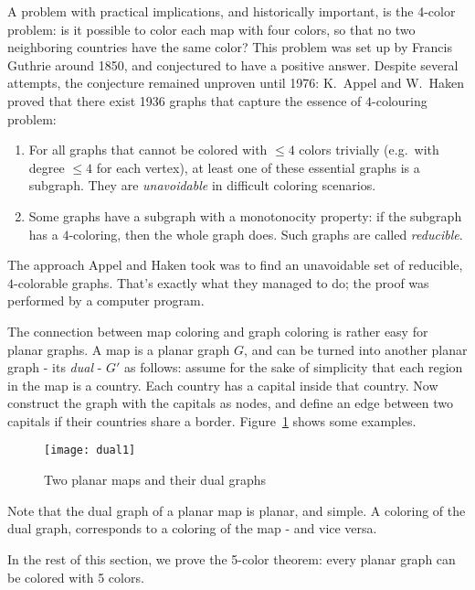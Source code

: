 A problem with practical implications, and historically important, is
the 4-color problem: is it possible to color each map with four
colors, so that no two neighboring countries have the same color? This
problem was set up by Francis Guthrie around 1850, and conjectured to
have a positive answer. Despite several attempts, the conjecture
remained unproven until 1976: K.\ Appel and W.\ Haken proved that there
exist 1936 graphs that capture the essence of $4$-colouring problem:
\begin{enumerate}
	\item For all graphs that cannot be colored with $\leq 4$ colors trivially (e.g.\ with degree $\leq 4$ for each vertex), at least one of these essential graphs is a subgraph. They are \emph{unavoidable} in difficult coloring scenarios.
	\item Some graphs have a subgraph with a monotonocity property: if the subgraph has a $4$-coloring, then the whole graph does. Such graphs are called \emph{reducible}.
\end{enumerate}
The approach Appel and Haken took was to find an unavoidable set of reducible, $4$-colorable graphs. That's exactly what they managed to do; the proof was performed by a computer program.

The connection between map coloring and graph coloring is rather easy
for planar graphs. A map is a planar graph $G$, and can be turned into
another planar graph - its {\em dual} - $G'$ as follows: assume for
the sake of simplicity that each region in the map is a country. Each
country has a capital inside that country. Now construct the graph
with the capitals as nodes, and define an edge between two capitals if
their countries share a border. Figure~\ref{dual1} shows some
examples.

\begin{figure}[ht]
	\centering
	\texttt{[image: dual1]}
	\caption{Two planar maps and their dual graphs\label{dual1}}
\end{figure}

Note that the dual graph of a planar map is planar, and simple. A
coloring of the dual graph, corresponds to a coloring of the map - and
vice versa.

In the rest of this section, we prove the 5-color theorem: every
planar graph can be colored with 5 colors.

